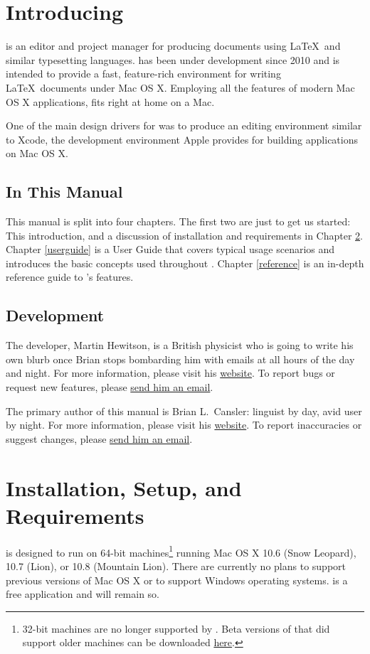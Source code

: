 \chapter{Introducing \texnicle}
\label{intro}
\texnicle is an editor and project manager for producing documents using \LaTeX\ and similar typesetting languages. \texnicle has been under development since 2010 and is intended to provide a fast, feature-rich environment for writing \LaTeX\ documents under Mac OS X. Employing all the features of modern Mac OS X applications, \texnicle fits right at home on a Mac.

One of the main design drivers for \texnicle was to produce an editing environment similar to Xcode, the development environment Apple provides for building applications on Mac OS X.

\section{In This Manual}
\label{inthismanual}
This manual is split into four chapters. The first two are just to get us started: This introduction, and a discussion of installation and requirements in Chapter \ref{requirements}. Chapter \ref{userguide} is a User Guide that covers typical usage scenarios and introduces the basic concepts used throughout \texnicle. Chapter \ref{reference} is an in-depth reference guide to \texnicle’s features.

\section{Development}
\label{dev}
The developer, Martin Hewitson, is a British physicist who is going to write his own blurb once Brian stops bombarding him with emails at all hours of the day and night. For more information, please visit his \href{http://bobsoft-mac.de}{website}. To report bugs or request new features, please \href{mailto:martin@bobsoft-mac.de}{send him an email}.

The primary author of this manual is Brian L.\ Cansler: linguist by day, avid \texnicle user by night. For more information, please visit his \href{http://unc.edu/~bcansler}{website}. To report inaccuracies or suggest changes, please \href{mailto:bcansler@me.com}{send him an email}.

\chapter{Installation, Setup, and Requirements}
\label{requirements}
\texnicle is designed to run on 64-bit machines\footnote{32-bit machines are no longer supported by \texnicle. Beta versions of \texnicle that did support older machines can be downloaded \href{http://bobsoft-mac.de}{here}.} running Mac OS X 10.6 (Snow Leopard), 10.7 (Lion), or 10.8 (Mountain Lion). There are currently no plans to support previous versions of Mac OS X or to support Windows operating systems. \texnicle is a free application and will remain so.

